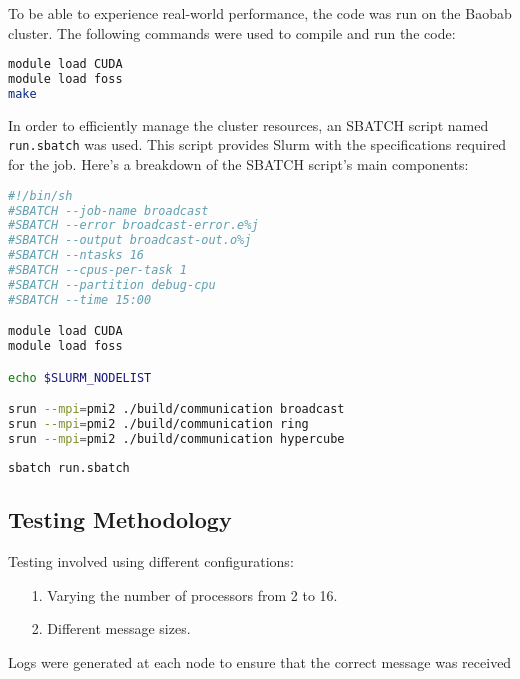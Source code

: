 \documentclass[11pt]{article}
\begin{document}
To be able to experience real-world performance, the code was run on the Baobab cluster. The following commands were used to compile and run the code:

\begin{lstlisting}[language=bash,caption=Compiling the code]
module load CUDA
module load foss
make
\end{lstlisting}

In order to efficiently manage the cluster resources, an SBATCH script named \texttt{run.sbatch} was used. This script provides Slurm with the specifications required for the job. Here's a breakdown of the SBATCH script's main components:

\begin{lstlisting}[language=bash,caption=SBATCH script]
#!/bin/sh
#SBATCH --job-name broadcast          
#SBATCH --error broadcast-error.e%j   
#SBATCH --output broadcast-out.o%j    
#SBATCH --ntasks 16                   
#SBATCH --cpus-per-task 1             
#SBATCH --partition debug-cpu         
#SBATCH --time 15:00                 

module load CUDA
module load foss

echo $SLURM_NODELIST

srun --mpi=pmi2 ./build/communication broadcast
srun --mpi=pmi2 ./build/communication ring
srun --mpi=pmi2 ./build/communication hypercube
\end{lstlisting}

\begin{lstlisting}[language=bash,caption=Running the code]
sbatch run.sbatch
\end{lstlisting}

\subsection{Testing Methodology}

Testing involved using different configurations:
\begin{itemize}
    \item [1.] Varying the number of processors from 2 to 16.
    \item [2.] Different message sizes.
\end{itemize}
Logs were generated at each node to ensure that the correct message was received
\end{document}
